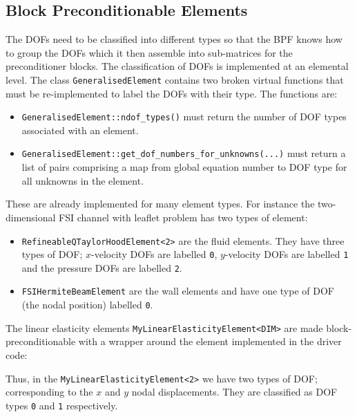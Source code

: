 \subsection{Block Preconditionable Elements\label{sec:block_preconditionable_elements}}
The DOFs need to be classified into different types so that the BPF knows how
to group the DOFs which it then assemble into sub-matrices for the 
preconditioner blocks. The classification of DOFs is implemented at an 
elemental level. The class \texttt{GeneralisedElement} contains two broken 
virtual functions that must be re-implemented to label the DOFs with their 
type. The functions are:
\begin{itemize}
\item \texttt{GeneralisedElement::ndof\_types()} must return the number of DOF 
types associated with an element.
\item \texttt{GeneralisedElement::get\_dof\_numbers\_for\_unknowns(...)} 
must return a list of pairs comprising a map from global equation number to DOF
type for all unknowns in the element.
\end{itemize}
These are already implemented for many element types. For instance the 
two-dimensional FSI channel with leaflet problem has two types of element:
\begin{itemize}
\item \texttt{RefineableQTaylorHoodElement<2>} are the fluid elements. They have
three types of DOF; $x$-velocity DOFs are labelled \texttt{0}, $y$-velocity DOFs
are labelled \texttt{1} and the pressure DOFs are labelled \texttt{2}.
\item \texttt{FSIHermiteBeamElement} are the wall elements and have one type of
  DOF (the nodal position) labelled \texttt{0}.
\end{itemize}
The linear elasticity elements \texttt{MyLinearElasticityElement<DIM>} are made 
block-preconditionable with a wrapper around the element implemented in the 
driver code:
\lstset{numberfirstline=true,numberstyle=\scriptsize,breaklines=true, numbers=left, stepnumber=2, frame=single,basicstyle=\ttfamily\scriptsize, showstringspaces=false, language=C++}

Thus, in the \texttt{MyLinearElasticityElement<2>} we have two types of DOF; 
corresponding to the $x$ and $y$ nodal displacements. They are classified as 
DOF types \texttt{0} and \texttt{1} respectively.

